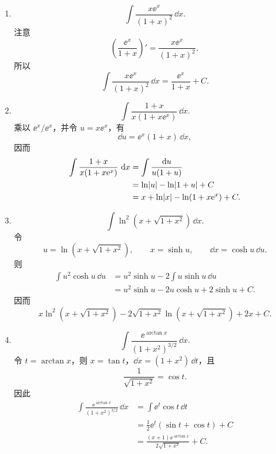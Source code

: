 \begin{xsolution}
\begin{enumerate}[label=(\arabic*)]
    \item
    \[
      \int\frac{x\ee^x}{(1+x)^2}\,\dd x.
    \]
    注意
    \[
      \left(\frac{\ee^x}{1+x}\right)'
      =\frac{x\ee^x}{(1+x)^2},
    \]
    所以
    \[
      \boxed{\int\frac{x\ee^x}{(1+x)^2}\,\dd x=\frac{\ee^x}{1+x}+C}.
    \]

    \item
    \[
      \int\frac{1+x}{x(1+x\ee^x)}\,\dd x.
    \]
    乘以 $\ee^x/\ee^x$，并令 $u=x\ee^x$，有
    \[
      \dd u=\ee^x(1+x)\,\dd x,
    \]
    因而
    \begin{align*}
      \int\frac{1+x}{x(1+x\mathrm{e}^x)}\,\mathop{}\!\mathrm{d} x
      &=\int\frac{\mathop{}\!\mathrm{d} u}{u(1+u)}\\
      &=\ln\lvert u\rvert-\ln\lvert1+u\rvert+C\\
      &=x+\ln\lvert x\rvert-\ln(1+x\mathrm{e}^x)+C.
    \end{align*}

    \item
    \[
      \int\ln^2(x+\sqrt{1+x^2})\,\dd x.
    \]
    令
    \[
      u=\ln(x+\sqrt{1+x^2}),
      \qquad
      x=\sinh u,
      \qquad
      \dd x=\cosh u\,\dd u.
    \]
    则
    \begin{align*}
      \int u^2\cosh u\,\dd u
      &=u^2\sinh u-2\int u\sinh u\,\dd u\\
      &=u^2\sinh u-2u\cosh u+2\sinh u+C.
    \end{align*}
    因而
    \[
      \boxed{x\ln^2(x+\sqrt{1+x^2})
      -2\sqrt{1+x^2}\ln(x+\sqrt{1+x^2})+2x+C}.
    \]

    \item
    \[
      \int\frac{\ee^{\arctan x}}{(1+x^2)^{3/2}}\,\dd x.
    \]
    令 $t=\arctan x$，则 $x=\tan t$，$\dd x=(1+x^2)\,\dd t$，且
    \[
      \frac1{\sqrt{1+x^2}}=\cos t.
    \]
    因此
    \begin{align*}
      \int\frac{\ee^{\arctan x}}{(1+x^2)^{3/2}}\,\dd x
      &=\int\ee^t\cos t\,\dd t\\
      &=\frac12\ee^t(\sin t+\cos t)+C\\
      &=\boxed{\frac{(x+1)\ee^{\arctan x}}{2\sqrt{1+x^2}}+C}.
    \end{align*}
  \end{enumerate}
\end{xsolution}


